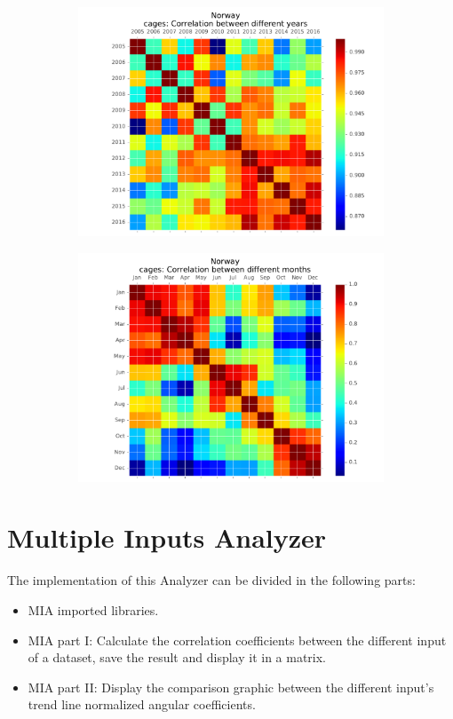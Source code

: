 \begin{figure}[H]
\begin{subfigure}{.5\textwidth}
	\centering
    \includegraphics[width=1\textwidth]{Files/Cages_Years_Matrix.pdf}
\end{subfigure}%
\begin{subfigure}{.5\textwidth}
	\centering
    \includegraphics[width=1\textwidth]{Files/Cages_Months_Matrix.pdf}
\end{subfigure}%
\end{figure}

\newpage

\section{Multiple Inputs Analyzer}
The implementation of this Analyzer can be divided in the following parts:
\begin{itemize}
\item MIA imported libraries. 
\item MIA part I: Calculate the correlation coefficients between the different input of a dataset, save the result and display it in a matrix.
\item MIA part II: Display the comparison graphic between the different input's trend line normalized angular coefficients.
\end{itemize}

